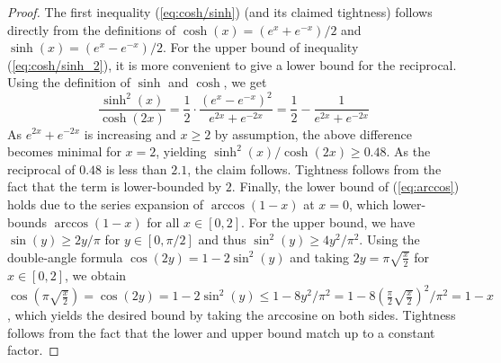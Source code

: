 \begin{proof}
    The first inequality (\ref{eq:cosh/sinh}) (and its claimed tightness) follows directly from the definitions of $\cosh(x) = (e^x + e^{-x}) / 2$ and $\sinh(x) = (e^x - e^{-x}) / 2$.
%
    For the upper bound of inequality (\ref{eq:cosh/sinh_2}), it is more convenient to give a lower bound for the reciprocal.
    Using the definition of $\sinh$ and $\cosh$, we get
    \begin{equation*}
        \frac{\sinh^2(x)}{\cosh(2x)} =
        \frac{1}{2} \cdot \frac{(e^x - e^{-x})^2}{e^{2x} + e^{-2x}} =
        \frac{1}{2} - \frac{1}{e^{2x} + e^{-2x}}
    \end{equation*}
    As $e^{2x} + e^{-2x}$ is increasing and $x \ge 2$ by assumption, the above difference becomes minimal for $x = 2$, yielding $\sinh^2(x) / \cosh(2x) \ge 0.48$.  As the reciprocal of $0.48$ is less than $2.1$, the claim follows.  Tightness follows from the fact that the term is lower-bounded by $2$.
%
    Finally, the lower bound of (\ref{eq:arccos}) holds due to the series expansion of $ \arccos(1-x) $ at $ x = 0 $, which lower-bounds $ \arccos(1-x) $ for all $ x \in [0,2] $.
    For the upper bound, we have $ \sin(y) \geq 2y/\pi $ for $ y \in [0, \pi/2] $ and thus $ \sin^2(y) \geq 4y^2/\pi^2 $.
    Using the double-angle formula $ \cos(2y) = 1 - 2 \sin^2(y) $ and taking $ 2y = \pi \sqrt{\frac{x}{2}} $ for $ x \in [0, 2] $, we obtain 
    $ \cos(\pi \sqrt{\frac{x}{2}}) 
    = \cos(2y) 
    = 1 - 2 \sin^2(y) 
    \leq 1 - 8y^2/\pi^2
    = 1 - 8 (\frac{\pi}{2} \sqrt{\frac{x}{2}})^2 / \pi^2
    = 1 - x $,
    which yields the desired bound by taking the arccosine on both sides.  Tightness follows from the fact that the lower and upper bound match up to a constant factor.
\end{proof}
